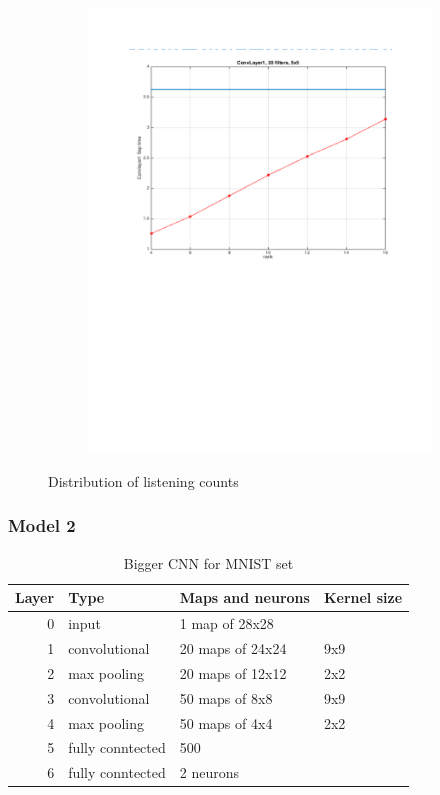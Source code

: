 \documentclass{article} %
\begin{document}
\begin{figure}[h]
\begin{subfigure}[b]{0.40\textwidth}
    \includegraphics[width=\textwidth]{images/imagesCNN_page5.pdf}
    \caption{}
  \end{subfigure}
  \caption{Distribution of listening counts}
  \label{fig:user_artist_distribution}
\end{figure}

\subsubsection{Model 2}
\begin{table}
\centering
\begin{tabular}{@{}rlll@{}}\toprule
Layer & Type & Maps and neurons& Kernel size \\ \midrule
0 & input & 1 map of 28x28 &\\
1& convolutional & 20 maps of 24x24 & 9x9\\
2 & max pooling & 20 maps of 12x12 & 2x2 \\
3 & convolutional & 50 maps of 8x8& 9x9 \\
4 & max pooling & 50 maps of 4x4& 2x2 \\ 
5 & fully conntected& 500 & \\
6 & fully conntected & 2 neurons & \\ \bottomrule
\end{tabular}
\caption{Bigger CNN for MNIST set}
\end{table}
\end{document}
